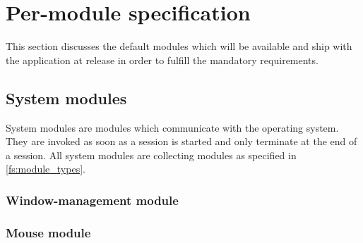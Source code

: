\section{Per-module specification}

This section discusses the default modules which will be available and ship with the application at release in order to fulfill the mandatory requirements.

\subsection{System modules}
System modules are modules which communicate with the operating system. They are invoked as soon as a session is started and only terminate at the end of a session. All system modules are collecting modules as specified in \ref{fs:module_types}.

\subsubsection{Window-management module}

\begin{specifications}
\end{specifications}

\subsubsection{Mouse module}

\begin{specifications}
\end{specifications}

